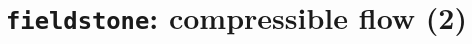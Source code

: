 \documentclass[a4paper]{article}
\begin{document}
\newpage
\section{{\tt fieldstone}: compressible flow (2)}




\end{document}
